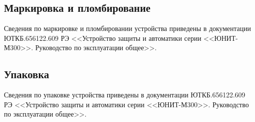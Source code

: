 \color{unimain}\subsection{Маркировка и пломбирование}\color{black}
Сведения по маркировке и пломбировании устройства приведены в документации ЮТКБ.656122.609 РЭ <<Устройство защиты и автоматики серии <<ЮНИТ-М300>>. Руководство по эксплуатации общее>>.

\color{unimain}\subsection{Упаковка}\color{black}
Сведения по упаковке устройства приведены в документации ЮТКБ.656122.609 РЭ <<Устройство защиты и автоматики серии <<ЮНИТ-М300>>. Руководство по эксплуатации общее>>.

